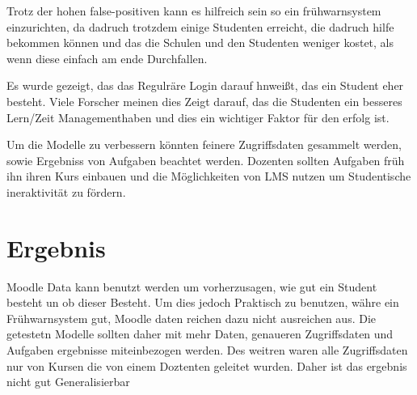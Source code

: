 Trotz der hohen false-positiven kann es hilfreich sein so ein frühwarnsystem einzurichten, da dadruch trotzdem einige Studenten erreicht, die dadruch hilfe bekommen können
und das die Schulen und den Studenten weniger kostet, als wenn diese einfach am ende Durchfallen.


Es wurde gezeigt, das das Regulräre Login darauf hnweißt, das ein Student eher besteht. Viele Forscher meinen dies Zeigt darauf, das die Studenten ein besseres Lern/Zeit Managementhaben und dies ein wichtiger Faktor für den erfolg ist.



Um die Modelle zu verbessern könnten feinere Zugriffsdaten gesammelt werden, sowie Ergebniss von Aufgaben beachtet werden. Dozenten sollten Aufgaben früh ihn ihren Kurs einbauen und die Möglichkeiten von LMS nutzen um Studentische ineraktivität zu fördern.


\section{Ergebnis}
Moodle Data kann benutzt werden um vorherzusagen, wie gut ein Student besteht un ob dieser Besteht. Um dies jedoch Praktisch zu benutzen, währe ein Frühwarnsystem gut, Moodle daten reichen dazu nicht ausreichen aus. 
Die getestetn Modelle sollten daher mit mehr Daten, genaueren Zugriffsdaten und Aufgaben ergebnisse miteinbezogen werden. 
Des weitren waren alle Zugriffsdaten nur von Kursen die von einem Doztenten geleitet wurden. Daher ist das ergebnis nicht gut Generalisierbar 